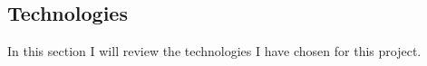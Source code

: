\subsection{Technologies}

In this section I will review the technologies I have chosen for this project.




